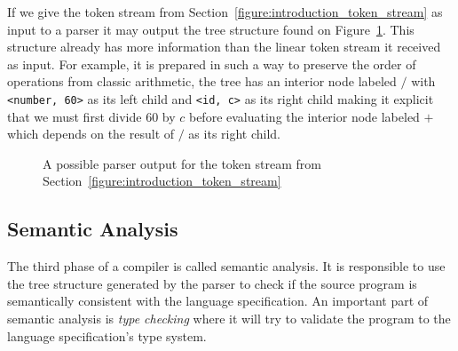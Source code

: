 \documentclass[
    oneside,
    english,
    embeddedlogo,
    noabntexcite
]{ufsc-thesis-rn46-2019}
\begin{document}

If we give the token stream from Section~\ref{figure:introduction_token_stream} as input to a parser it may output the tree structure found on Figure~\ref{figure:introduction_ast}.
This structure already has more information than the linear token stream it received as input.
For example, it is prepared in such a way to preserve the order of operations from classic arithmetic, the tree has an interior node labeled $/$ with \verb+<number, 60>+ as its left child and \verb+<id, c>+ as its right child making it explicit that we must first divide $60$ by $c$ before evaluating the interior node labeled $+$ which depends on the result of $/$ as its right child.

\begin{figure}
    \caption{A possible parser output for the token stream from Section~\ref{figure:introduction_token_stream}}\label{figure:introduction_ast}
    \centering
\end{figure}

\subsection{Semantic Analysis}

The third phase of a compiler is called semantic analysis.
It is responsible to use the tree structure generated by the parser to check if the source program is semantically consistent with the language specification.
An important part of semantic analysis is \textit{type checking} where it will try to validate the program to the language specification's type system.
\end{document}
